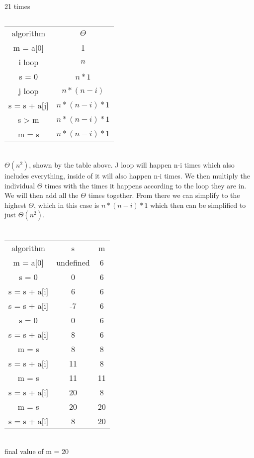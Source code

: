 \documentclass[letterpaper]{article}
\begin{document}
        \subsection{}
        	21 times
        \subsection{}
            \begin{tabular}{cc}
            algorithm & $\Theta$ \\
            m = a[0] & 1\\
            i loop & $n$\\
            s = 0 & $n * 1$\\
            j loop & $n * (n - i)$\\
            s = s + a[j] & $n * (n - i) * 1$\\
            s > m & $n * (n - i) * 1$\\
            m = s & $n * (n - i) * 1$\\
            \end{tabular}\\
            $\Theta(n^2)$, shown by the table above.  J loop will happen n-i times which also includes everything, inside of it will also happen n-i times.  We then multiply the individual $\Theta$ times with the times it happens according to the loop they are in.  We will then add all the $\Theta$ times together.  From there we can simplify to the highest $\Theta$, which in this case is $n * (n - i) * 1$ which then can be simplified to just $\Theta(n^2)$.
    \section{}	
    	\subsection{}
        	\begin{tabular}{ccc}
        		algorithm & s & m\\
                m = a[0] & undefined & 6\\
                s = 0 & 0 & 6\\
                s = s + a[i] & 6 & 6\\
                s = s + a[i] & -7 & 6\\
                s = 0 & 0 & 6\\
                s = s + a[i] & 8 & 6\\
                m = s & 8 & 8\\
                s = s + a[i] & 11 & 8\\
                m = s & 11 & 11\\
                s = s + a[i] & 20 & 8\\
                m = s & 20 & 20\\
                s = s + a[i] & 8 & 20\\
        	\end{tabular}\\
            final value of m = 20
\end{document}
